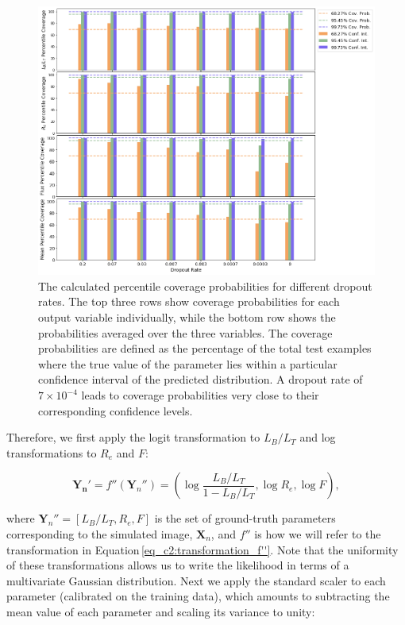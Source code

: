 \begin{figure}[htb]
    \centering
    \includegraphics[width
    =\textwidth]{dropout_calibration_new.png}
    \caption{The calculated percentile coverage probabilities for different dropout rates. The top three rows show coverage probabilities for each output variable individually, while the bottom row shows the probabilities averaged over the three variables. The coverage probabilities are defined as the percentage of the total test examples where the  true  value  of  the  parameter  lies  within  a  particular confidence interval of the predicted distribution. A dropout rate of $7\times10^{-4}$ leads to coverage probabilities very close to their corresponding confidence levels.}
    \label{fig_c2:dropout_calibration}
\end{figure}

Therefore, we first apply the logit transformation to $L_B/L_T$ and log transformations to $R_e$ and $F$: 

\begin{equation}
\boldsymbol{Y_n'} = f''(\boldsymbol{Y}_n'') = \left( \log \frac{L_B/L_T}{1 - L_B/L_T}, \log R_e, \log F \right) ,
\label{eq_c2:transformation_f''}
\end{equation} 

\noindent
where $\boldsymbol{Y}_n'' = [{L_B/L_T,R_e,F}]$ is the set of ground-truth parameters corresponding to the simulated image, $\boldsymbol{X}_n$, and $f''$ is how we will refer to the transformation in Equation\,\ref{eq_c2:transformation_f''}. Note that the uniformity of these transformations allows us to write the likelihood in terms of a multivariate Gaussian distribution. Next we apply the standard scaler to each parameter (calibrated on the training data), which amounts to subtracting the mean value of each parameter and scaling its variance to unity:

